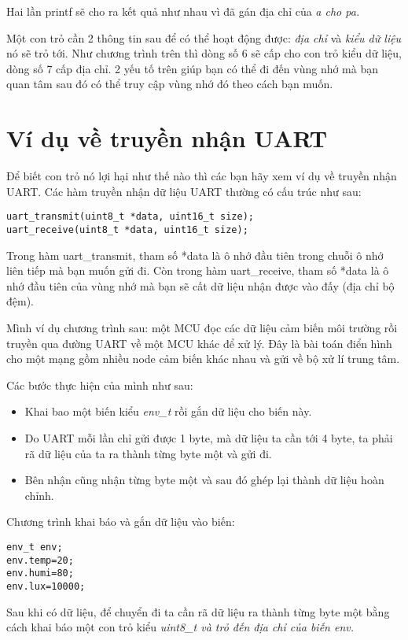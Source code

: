 Hai lần printf sẽ cho ra kết quả như nhau vì đã gán địa chỉ của \it{a} cho \it{pa}.

Một con trỏ cần 2 thông tin sau để có thể hoạt động được: \textit{địa chỉ} và \textit{kiểu dữ liệu} nó sẽ trỏ tới. Như chương trình trên thì dòng số 6 sẽ cấp cho con trỏ kiểu dữ liệu, dòng số 7 cấp địa chỉ. 2 yếu tố trên giúp bạn có thể đi đến vùng nhớ mà bạn quan tâm sau đó có thể truy cập vùng nhớ đó theo cách bạn muốn.

\section{Ví dụ về truyền nhận UART}

Để biết con trỏ nó lợi hại như thế nào thì các bạn hãy xem ví dụ về truyền nhận UART. Các hàm truyền nhận dữ liệu UART thường có cấu trúc như sau:

\begin{lstlisting}
uart_transmit(uint8_t *data, uint16_t size);
uart_receive(uint8_t *data, uint16_t size);
\end{lstlisting}

Trong hàm uart\_transmit, tham số *data là ô nhớ đầu tiên trong chuỗi ô nhớ liên tiếp mà bạn muốn gửi đi. Còn trong hàm uart\_receive, tham số *data là ô nhớ đầu tiên của vùng nhớ mà bạn sẽ cất dữ liệu nhận được vào đấy (địa chỉ bộ đệm).

Mình ví dụ chương trình sau: một MCU đọc các dữ liệu cảm biến môi trường rồi truyền qua đường UART về một MCU khác để xử lý. Đây là bài toán điển hình cho một mạng gồm nhiều node cảm biến khác nhau và gửi về bộ xử lí trung tâm.

Các bước thực hiện của mình như sau:
\begin{itemize}
    \item Khai bao một biến kiểu \textit{env\_t} rồi gắn dữ liệu cho biến này.
    \item Do UART mỗi lần chỉ gửi được 1 byte, mà dữ liệu ta cần tới 4 byte, ta phải rã dữ liệu của ta ra thành từng byte một và gửi đi.
    \item Bên nhận cũng nhận từng byte một và  sau đó ghép lại thành dữ liệu hoàn chỉnh.
\end{itemize}

Chương trình khai báo và gắn dữ liệu vào biến:
\begin{lstlisting}
env_t env;
env.temp=20;
env.humi=80;
env.lux=10000;
\end{lstlisting}

Sau khi có dữ liệu, để chuyển đi ta cần rã dữ liệu ra thành từng byte một bằng cách khai báo một con trỏ kiểu \it{uint8\_t} và trỏ đến địa chỉ của biến \it{env}.

